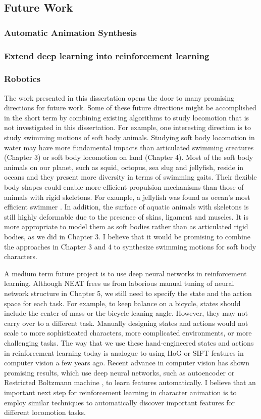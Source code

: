 \subsection{Future Work}
\subsubsection{Automatic Animation Synthesis}
\subsubsection{Extend deep learning into reinforcement learning}
\subsubsection{Robotics}
The work presented in this dissertation opens the door to many promising directions for future work. Some of these future directions might be accomplished in the short term by combining existing algorithms to study locomotion that is not investigated in this dissertation. For example, one interesting direction is to study swimming motions of soft body animals. Studying soft body locomotion in water may have more fundamental impacts than articulated swimming creatures (Chapter 3) or soft body locomotion on land (Chapter 4). Most of the soft body animals on our planet, such as squid, octopus, sea slug and jellyfish, reside in oceans and they present more diversity in terms of swimming gaits. Their flexible body shapes could enable more efficient propulsion mechanisms than those of animals with rigid skeletons. For example, a jellyfish was found as ocean's most efficient swimmer \cite{Gemmell:2013}. In addition, the surface of aquatic animals with skeletons is still highly deformable due to the presence of skins, ligament and muscles. It is more appropriate to model them as soft bodies rather than as articulated rigid bodies, as we did in Chapter 3. I believe that it would be promising to combine the approaches in Chapter 3 and 4 to synthesize swimming motions for soft body characters.

A medium term future project is to use deep neural networks in reinforcement learning. Although NEAT frees us from laborious manual tuning of neural network structure in Chapter 5, we still need to specify the state and the action space for each task. For example, to keep balance on a bicycle, states should include the center of mass or the bicycle leaning angle. However, they may not carry over to a different task. Manually designing states and actions would not scale to more sophisticated characters, more complicated environments, or more challenging tasks. The way that we use these hand-engineered states and actions in reinforcement learning today is analogue to using HoG or SIFT features in computer vision a few years ago. Recent advance in computer vision has shown promising results, which use deep neural networks, such as autoencoder \cite{Vincent:2008} or Restricted Boltzmann machine \cite{Hinton:2012}, to learn features automatically. I believe that an important next step for reinforcement learning in character animation is to employ similar techniques to automatically discover important features for different locomotion tasks.

